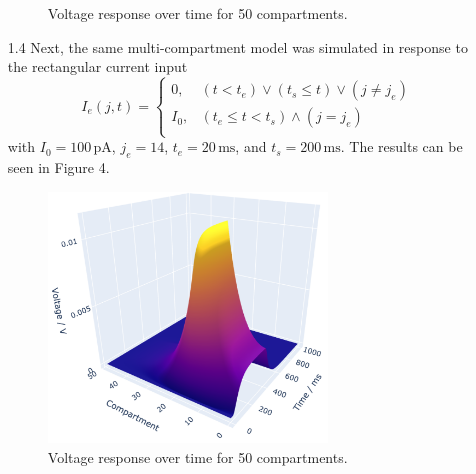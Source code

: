 \documentclass[12pt]{article}
\begin{document}
\begin{enumerate}
\begin{figure}[h]
        \caption{Voltage response over time for 50 compartments.}
    \end{figure}
    \item[1.4] Next, the same multi-compartment model was simulated in response to the rectangular current input
    \[
        I_{e}(j, t)= 
        \begin{cases}
            0, & (t < t_{e}) \vee (t_{s} \leqslant t) \vee (j \neq j_{e})\\
            I_{0}, & (t_{e} \leqslant t < t_{s}) \wedge (j = j_{e})\\
        \end{cases}
        \]
    with $I_{0}=100 \, \text{pA}$, $j_{e}=14$, $t_{e}=20 \, \text{ms}$, and $t_{s}=200 \, \text{ms}$. The results can be seen in Figure 4.
    \begin{figure}[h]
        \centering
        \includegraphics[width=0.7\textwidth]{Figures/fig2_3d.png}
        \caption{Voltage response over time for 50 compartments.}
    \end{figure}
\end{enumerate}
\end{document}
